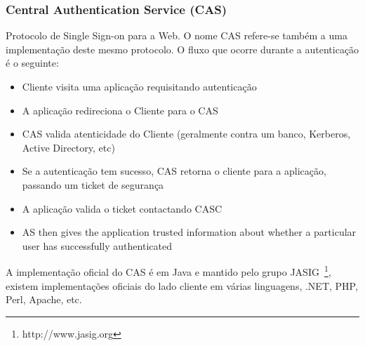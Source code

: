 \documentclass[11pt]{article}
\begin{document}
\subsubsection{Central Authentication Service (CAS)}

Protocolo de Single Sign-on para a Web. O nome CAS refere-se também a uma
implementação deste mesmo protocolo. O fluxo que ocorre durante a autenticação
é o seguinte:

\begin{itemize}
\item{Cliente visita uma aplicação requisitando autenticação}
\item{A aplicação redireciona o Cliente para o CAS}
\item{CAS valida atenticidade do Cliente (geralmente contra um banco, Kerberos, Active Directory, etc)}
\item{Se a autenticação tem sucesso, CAS retorna o cliente para a aplicação, passando um ticket de segurança}
\item{A aplicação valida o ticket contactando CASC}
\item{AS then gives the application trusted information about whether a particular user has successfully authenticated}
\end{itemize}

A implementação oficial do CAS é em Java e mantido pelo grupo
JASIG~\footnote{http://www.jasig.org}, existem implementações oficiais do lado
cliente em várias linguagens, .NET, PHP, Perl, Apache, etc.
\end{document}
